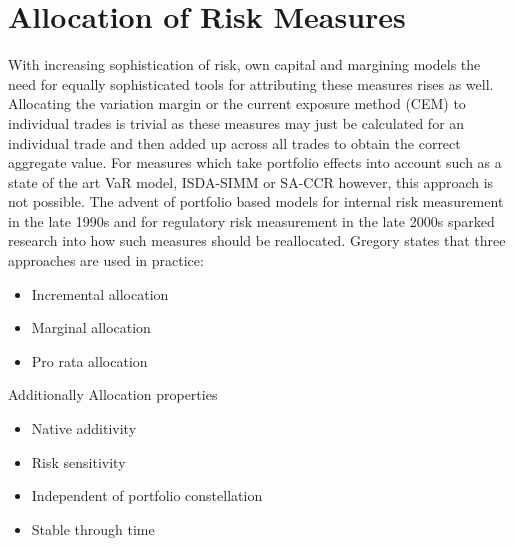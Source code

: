 \documentclass[../Thesis_AHoecherl.tex]{subfiles}
\begin{document}
\section{Allocation of Risk Measures}\label{Allocation of Risk Measures}

With increasing sophistication of risk, own capital and margining models the need for equally sophisticated tools for attributing these measures rises as well. Allocating the variation margin or the current exposure method (CEM) to individual trades is trivial as these measures may just be calculated for an individual trade and then added up across all trades to obtain the correct aggregate value. For measures which take portfolio effects into account such as a state of the art VaR model, ISDA-SIMM or SA-CCR however, this approach is not possible. The advent of portfolio based models for internal risk measurement in the late 1990s and for regulatory risk measurement in the late 2000s sparked research into how such measures should be reallocated. Gregory \cite[Chapter~10.7]{gregory2015xva} states that three approaches are used in practice: \begin{itemize}
\item Incremental allocation
\item Marginal allocation 
\item Pro rata allocation
\end{itemize}
Additionally \citep{koyluoglu2002risk}
Allocation properties
\begin{itemize}
\item Native additivity
\item Risk sensitivity
\item Independent of portfolio constellation
\item Stable through time
\end{itemize}
\end{document}
